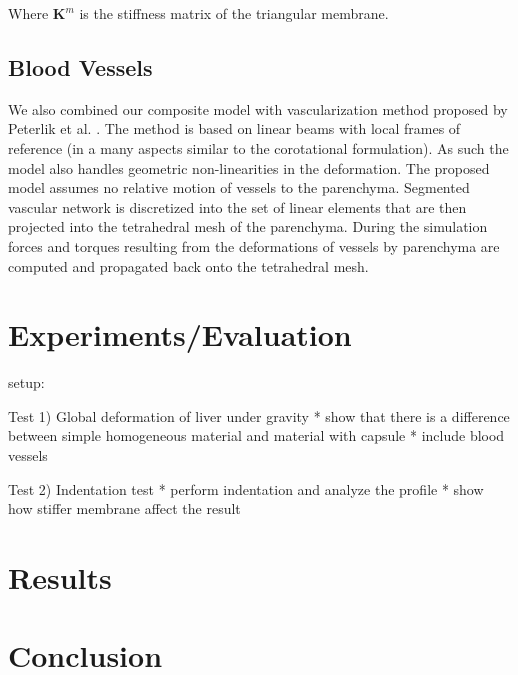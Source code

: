 \documentclass{llncs}
\newcommand{\Mat}[1]{\mathbf{#1}}
\begin{document}
Where $\Mat{K}^m$ is the stiffness matrix of the triangular membrane.


\subsection{Blood Vessels} %

We also combined our composite model with vascularization method proposed
by Peterlik et al. \cite{Peterlik2012}. The method is based on linear beams
with local frames of reference (in a many aspects similar to the
corotational formulation). As such the model also handles geometric
non-linearities in the deformation. The proposed model assumes no relative
motion of vessels to the parenchyma. Segmented vascular network is
discretized into the set of linear elements that are then projected into
the tetrahedral mesh of the parenchyma. During the simulation forces and
torques resulting from the deformations of vessels by parenchyma are
computed and propagated back onto the tetrahedral mesh.



\section{Experiments/Evaluation}

setup:

Test 1) Global deformation of liver under gravity
  * show that there is a difference between simple homogeneous material
    and material with capsule
  * include blood vessels

Test 2) Indentation test
  * perform indentation and analyze the profile
  * show how stiffer membrane affect the result


\section{Results}

\section{Conclusion}



%
%



\end{document}
